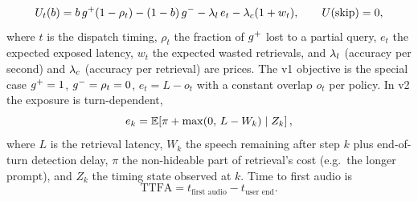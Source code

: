 \begin{equation}
U_t(b)=b\,g^{+}(1-\rho_t)-(1-b)\,g^{-}-\lambda_l\,e_t-\lambda_c(1+w_t),\qquad U(\text{skip})=0,
\label{eq:obj}
\end{equation}
where $t$ is the dispatch timing, $\rho_t$ the fraction of $g^{+}$ lost to a
partial query, $e_t$ the expected exposed latency, $w_t$ the expected wasted
retrievals, and $\lambda_l$ (accuracy per second) and $\lambda_c$ (accuracy per
retrieval) are prices. The v1 objective is the special case $g^{+}=1$,
$g^{-}=\rho_t=0$, $e_t=L-o_t$ with a constant overlap $o_t$ per policy.
In v2 the exposure is turn-dependent,
\begin{equation}
e_k=\mathbb{E}\!\left[\pi+\max(0,\,L-W_k)\mid Z_k\right],
\label{eq:exposure}
\end{equation}
where $L$ is the retrieval latency, $W_k$ the speech remaining after step $k$
plus end-of-turn detection delay, $\pi$ the non-hideable part of retrieval's
cost (e.g.\ the longer prompt), and $Z_k$ the timing state observed at $k$.
Time to first audio is
\begin{equation}
\mathrm{TTFA}=t_{\text{first audio}}-t_{\text{user end}}.
\label{eq:ttfa}
\end{equation}

